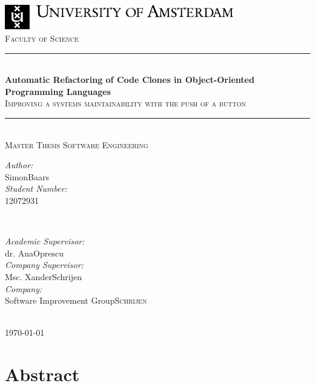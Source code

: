 \documentclass{report}
\title{\thesistitle}
\author{\thesisauthorfirst\space\thesisauthorsecond}
\date{\thesisdate}
\def\thesistitle{Automatic Refactoring of Code Clones in Object-Oriented Programming Languages}
\def\thesissubtitle{Improving a systems maintainability with the push of a button}
\def\thesisauthorfirst{Simon}
\def\thesisauthorsecond{Baars}
\def\thesissupervisorfirst{dr. Ana}
\def\thesissupervisorsecond{Oprescu}
\def\thesissecondreaderfirst{Msc. Xander}
\def\thesissecondreadersecond{Schrijen}
\def\thesisdate{\today}
\theoremstyle{definition}
\theoremstyle{remark}
\begin{document}
\begin{titlepage}
	\thispagestyle{empty}
	\newcommand{\HRule}{\rule{\linewidth}{0.5mm}}
	\center
	\includegraphics[width=100mm]{img/logoUvA_en.pdf}\\[.5cm]
	\textsc{Faculty of Science}\\[0.5cm]

	\HRule \\[0.4cm]
	{ \huge \bfseries \thesistitle}\\[0.1cm]
	\textsc{\thesissubtitle}\\
	\HRule \\[.5cm]
	\textsc{\large Master Thesis Software Engineering}\\[2cm]

	\begin{minipage}{0.4\textwidth}
	\begin{flushleft} \large
	\emph{Author:}\\
	\thesisauthorfirst\space \thesisauthorsecond \\[1em]
	\emph{Student Number:}\\
	12072931 \\[1em]
	\end{flushleft}
	\end{minipage}
	~
	\begin{minipage}{0.4\textwidth}
	\begin{flushright} \large
	\emph{Academic Supervisor:} \\
	\thesissupervisorfirst\space \thesissupervisorsecond \\[1em]
	\emph{Company Supervisor:} \\
	\thesissecondreaderfirst\space \thesissecondreadersecond \\[1em]
	\emph{Company:} \\
	Software Improvement Group\space \textsc{\thesissecondreadersecond}
	\end{flushright}
	\end{minipage}\\[4cm]
	\vfill
	{\large \thesisdate}\\
	\clearpage
\end{titlepage}

\tableofcontents

\chapter{Abstract}
\end{document}
